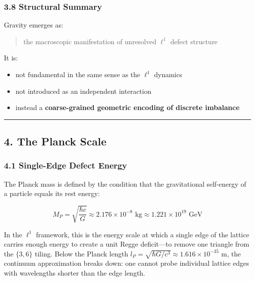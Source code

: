 \documentclass[
]{article}
\providecommand{\tightlist}{%
  \setlength{\itemsep}{0pt}\setlength{\parskip}{0pt}}
\begin{document}
\hypertarget{structural-summary}{%
\subsubsection{3.8 Structural Summary}\label{structural-summary}}

Gravity emerges as:

\begin{quote}
the macroscopic manifestation of unresolved \(\ell^1\) defect structure
\end{quote}

It is:

\begin{itemize}
\tightlist
\item
  not fundamental in the same sense as the \(\ell^1\) dynamics
\item
  not introduced as an independent interaction
\item
  instead a \textbf{coarse-grained geometric encoding of discrete
  imbalance}
\end{itemize}

\begin{center}\rule{0.5\linewidth}{0.5pt}\end{center}

\hypertarget{the-planck-scale}{%
\subsection{4. The Planck Scale}\label{the-planck-scale}}

\hypertarget{single-edge-defect-energy}{%
\subsubsection{4.1 Single-Edge Defect
Energy}\label{single-edge-defect-energy}}

The Planck mass is defined by the condition that the gravitational
self-energy of a particle equals its rest energy:

\[M_P = \sqrt{\frac{\hbar c}{G}} \approx 2.176 \times 10^{-8} \text{ kg} \approx 1.221 \times 10^{19} \text{ GeV}\]

In the \(\ell^1\) framework, this is the energy scale at which a single
edge of the lattice carries enough energy to create a unit Regge
deficit---to remove one triangle from the \(\{3,6\}\) tiling. Below the
Planck length
\(l_P = \sqrt{\hbar G / c^3} \approx 1.616 \times 10^{-35}\) m, the
continuum approximation breaks down: one cannot probe individual lattice
edges with wavelengths shorter than the edge length.
\end{document}
